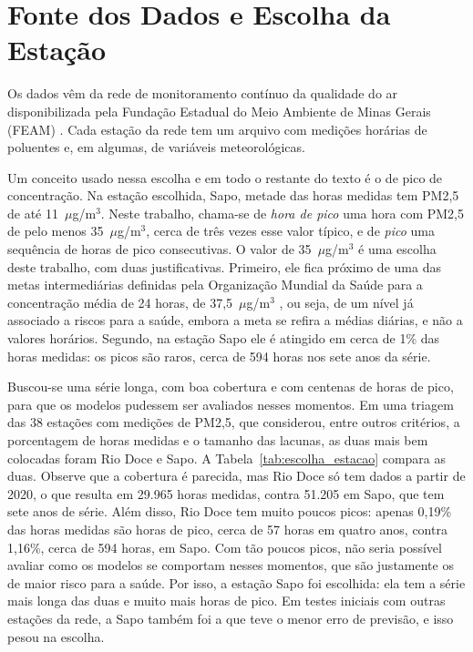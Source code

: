 \section{Fonte dos Dados e Escolha da Estação}
\label{sec:escolha_estacao}

Os dados vêm da rede de monitoramento contínuo da qualidade do ar disponibilizada pela Fundação Estadual do Meio Ambiente de Minas Gerais (FEAM) \cite{feam2026dadosmonitoramento}. Cada estação da rede tem um arquivo com medições horárias de poluentes e, em algumas, de variáveis meteorológicas.

Um conceito usado nessa escolha e em todo o restante do texto é o de pico de concentração. Na estação escolhida, Sapo, metade das horas medidas tem PM2,5 de até 11~\(\mu\)g/m\(^3\). Neste trabalho, chama-se de \emph{hora de pico} uma hora com PM2,5 de pelo menos 35~\(\mu\)g/m\(^3\), cerca de três vezes esse valor típico, e de \emph{pico} uma sequência de horas de pico consecutivas. O valor de 35~\(\mu\)g/m\(^3\) é uma escolha deste trabalho, com duas justificativas. Primeiro, ele fica próximo de uma das metas intermediárias definidas pela Organização Mundial da Saúde para a concentração média de 24 horas, de 37,5~\(\mu\)g/m\(^3\) \cite{who2021air}, ou seja, de um nível já associado a riscos para a saúde, embora a meta se refira a médias diárias, e não a valores horários. Segundo, na estação Sapo ele é atingido em cerca de 1\% das horas medidas: os picos são raros, cerca de 594 horas nos sete anos da série.

Buscou-se uma série longa, com boa cobertura e com centenas de horas de pico, para que os modelos pudessem ser avaliados nesses momentos. Em uma triagem das 38 estações com medições de PM2,5, que considerou, entre outros critérios, a porcentagem de horas medidas e o tamanho das lacunas, as duas mais bem colocadas foram Rio Doce e Sapo. A Tabela~\ref{tab:escolha_estacao} compara as duas. Observe que a cobertura é parecida, mas Rio Doce só tem dados a partir de 2020, o que resulta em 29.965 horas medidas, contra 51.205 em Sapo, que tem sete anos de série. Além disso, Rio Doce tem muito poucos picos: apenas 0,19\% das horas medidas são horas de pico, cerca de 57 horas em quatro anos, contra 1,16\%, cerca de 594 horas, em Sapo. Com tão poucos picos, não seria possível avaliar como os modelos se comportam nesses momentos, que são justamente os de maior risco para a saúde. Por isso, a estação Sapo foi escolhida: ela tem a série mais longa das duas e muito mais horas de pico. Em testes iniciais com outras estações da rede, a Sapo também foi a que teve o menor erro de previsão, e isso pesou na escolha.

